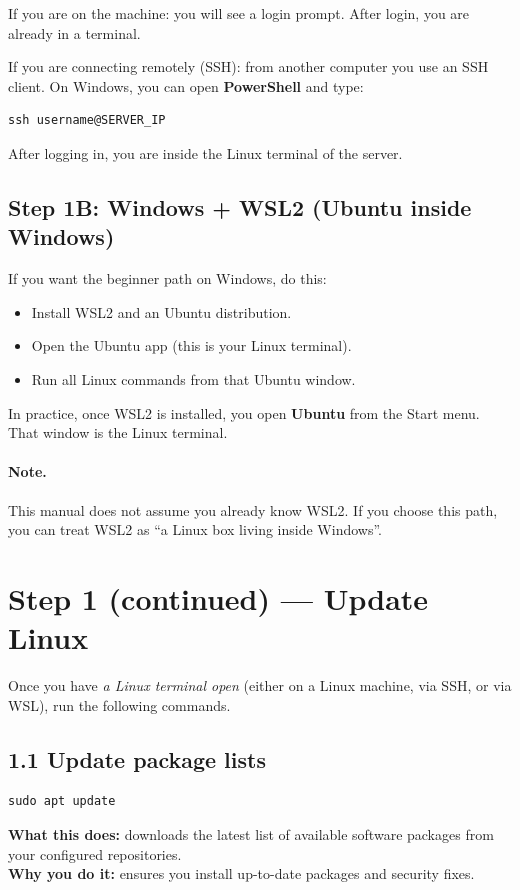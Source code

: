 If you are on the machine: you will see a login prompt. After login, you are already in a terminal.

If you are connecting remotely (SSH): from another computer you use an SSH client.
On Windows, you can open \textbf{PowerShell} and type:
\begin{lstlisting}
ssh username@SERVER_IP
\end{lstlisting}
After logging in, you are inside the Linux terminal of the server.

\subsection{Step 1B: Windows + WSL2 (Ubuntu inside Windows)}
If you want the beginner path on Windows, do this:
\begin{itemize}[leftmargin=*]
  \item Install WSL2 and an Ubuntu distribution.
  \item Open the Ubuntu app (this is your Linux terminal).
  \item Run all Linux commands from that Ubuntu window.
\end{itemize}

In practice, once WSL2 is installed, you open \textbf{Ubuntu} from the Start menu.
That window is the Linux terminal.

\paragraph{Note.}
This manual does not assume you already know WSL2. If you choose this path,
you can treat WSL2 as ``a Linux box living inside Windows''.

\section{Step 1 (continued) --- Update Linux}
Once you have \emph{a Linux terminal open} (either on a Linux machine, via SSH, or via WSL),
run the following commands.

\subsection{1.1 Update package lists}
\begin{lstlisting}
sudo apt update
\end{lstlisting}
\textbf{What this does:} downloads the latest list of available software packages from your configured repositories. \\
\textbf{Why you do it:} ensures you install up-to-date packages and security fixes.


